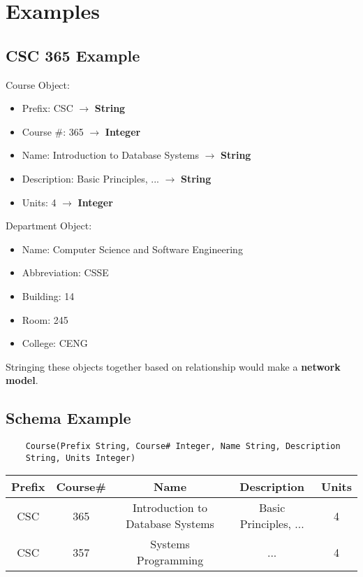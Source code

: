 \documentclass[twoside]{article}
\begin{document}
\section*{Examples}
\subsection*{CSC 365 Example}

Course Object:
\begin{itemize}
    \item Prefix: CSC $\longrightarrow$ \textbf{String}
    \item Course \#: 365 $\longrightarrow$ \textbf{Integer}
    \item Name: Introduction to Database Systems $\longrightarrow$ \textbf{String}
    \item Description: Basic Principles, ... $\longrightarrow$ \textbf{String}
    \item Units: 4 $\longrightarrow$ \textbf{Integer}
\end{itemize}
Department Object:
\begin{itemize}
    \item Name: Computer Science and Software Engineering
    \item Abbreviation: CSSE
    \item Building: 14
    \item Room: 245
    \item College: CENG
\end{itemize}

Stringing these objects together based on relationship would 
make a \textbf{network model}.

\subsection*{Schema Example}
\begin{verbatim}
    Course(Prefix String, Course# Integer, Name String, Description
    String, Units Integer)
\end{verbatim}

\begin{table}[h]
    \centering
    \begin{tabular}{|c|c|c|c|c|}
        \hline
        Prefix & Course\# & Name & Description & Units \\
        \hline
        CSC & 365 & Introduction to Database Systems & Basic Principles, ... & 4 \\
        \hline
        CSC & 357 & Systems Programming & ... & 4 \\
        \hline
    \end{tabular}
\end{table}
\end{document}
